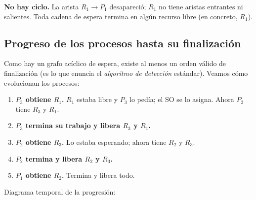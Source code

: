 \documentclass[11pt,a4paper]{article}
\begin{document}
\begin{center}
\end{center}

\textbf{No hay ciclo.} La arista $R_1 \to P_1$ desapareció; $R_1$ no
tiene aristas entrantes ni salientes. Toda cadena de espera termina en
algún recurso libre (en concreto, $R_1$).

\subsection*{Progreso de los procesos hasta su finalización}

Como hay un grafo acíclico de espera, existe al menos un orden válido
de finalización (es lo que enuncia el \emph{algoritmo de detección}
estándar). Veamos cómo evolucionan los procesos:

\begin{enumerate}[leftmargin=*]
    \item \textbf{$P_3$ obtiene $R_1$.} $R_1$ estaba libre y $P_3$ lo
        pedía; el SO se lo asigna. Ahora $P_3$ tiene $R_3$ y $R_1$.
    \item \textbf{$P_3$ termina su trabajo y libera $R_3$ y $R_1$.}
    \item \textbf{$P_2$ obtiene $R_3$.} Lo estaba esperando; ahora
        tiene $R_2$ y $R_3$.
    \item \textbf{$P_2$ termina y libera $R_2$ y $R_3$.}
    \item \textbf{$P_1$ obtiene $R_2$.} Termina y libera todo.
\end{enumerate}

Diagrama temporal de la progresión:
\end{document}
